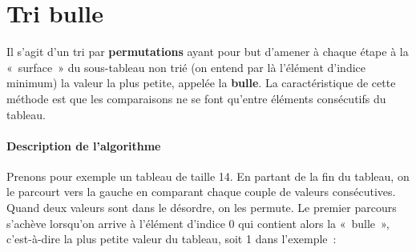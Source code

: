 \section{Tri bulle}
\label{chap:tri-bubble}
	
	Il s’agit d’un tri par \textbf{permutations} 
	ayant pour but d’amener à chaque étape à la «~surface~» 
	du sous-tableau non trié 
	(on entend par là l’élément d’indice minimum) 
	la valeur la plus petite, 
	appelée la \textbf{bulle}. 
	La caractéristique de cette méthode est que les
	comparaisons ne se font qu’entre éléments consécutifs du tableau.

	\paragraph{Description de l’algorithme}

	Prenons pour exemple un tableau de taille 14. En partant de la fin du
	tableau, on le parcourt vers la gauche en comparant chaque couple de
	valeurs consécutives. Quand deux valeurs sont dans le désordre, on les
	permute. Le premier parcours s’achève lorsqu’on arrive à l’élément
	d’indice 0 qui contient alors la «~bulle~»,
	c’est-à-dire la plus petite valeur du tableau, soit 1 dans l'exemple~:

